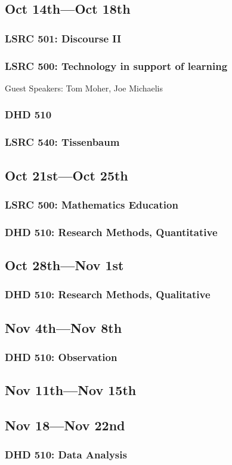 \documentclass{TC}
\begin{document}
\subsection{Oct 14th---Oct 18th}
	\subsubsection{LSRC 501: Discourse II}

	\subsubsection{LSRC 500: Technology in support of learning}
	Guest Speakers: Tom Moher, Joe Michaelis
	
	\subsubsection{DHD 510}
	
	\subsubsection{LSRC 540: Tissenbaum}
	
	
\subsection{Oct 21st---Oct 25th}
	\subsubsection{LSRC 500: Mathematics Education}
	
	\subsubsection{DHD 510: Research Methods, Quantitative}
	
	
\subsection{Oct 28th---Nov 1st}
	\subsubsection{DHD 510: Research Methods, Qualitative}
	
	
\subsection{Nov 4th---Nov 8th}
	\subsubsection{DHD 510: Observation}
	
	
\subsection{Nov 11th---Nov 15th}

\subsection{Nov 18---Nov 22nd}
	\subsubsection{DHD 510: Data Analysis}
	
\end{document}
